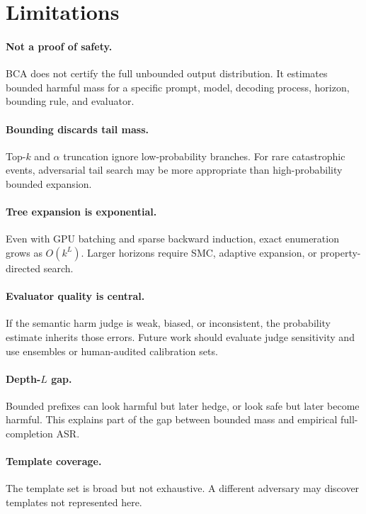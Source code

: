 \documentclass[11pt]{article}
\newcommand{\BCA}{\textsc{BCA}}
\newcommand{\ASR}{\textsc{ASR}}
\begin{document}
\section{Limitations}
\label{sec:limitations}

\paragraph{Not a proof of safety.}
\BCA{} does not certify the full unbounded output distribution.  It estimates bounded harmful mass for a specific prompt, model, decoding process, horizon, bounding rule, and evaluator.

\paragraph{Bounding discards tail mass.}
Top-$k$ and $\alpha$ truncation ignore low-probability branches.  For rare catastrophic events, adversarial tail search may be more appropriate than high-probability bounded expansion.

\paragraph{Tree expansion is exponential.}
Even with GPU batching and sparse backward induction, exact enumeration grows as $O(k^L)$.  Larger horizons require SMC, adaptive expansion, or property-directed search.

\paragraph{Evaluator quality is central.}
If the semantic harm judge is weak, biased, or inconsistent, the probability estimate inherits those errors.  Future work should evaluate judge sensitivity and use ensembles or human-audited calibration sets.

\paragraph{Depth-$L$ gap.}
Bounded prefixes can look harmful but later hedge, or look safe but later become harmful.  This explains part of the gap between bounded mass and empirical full-completion \ASR.

\paragraph{Template coverage.}
The template set is broad but not exhaustive.  A different adversary may discover templates not represented here.
\end{document}
